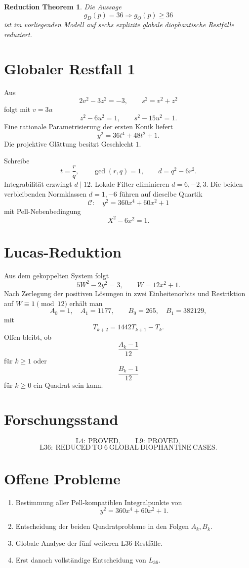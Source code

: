 \documentclass[11pt,a4paper]{article}
\newtheorem{reduction}[theorem]{Reduction Theorem}
\theoremstyle{definition}
\begin{document}
\begin{reduction}
Die Aussage
\[
g_D(p)=36\Longrightarrow g_O(p)\ge36
\]
ist im vorliegenden Modell auf sechs explizite globale diophantische Restfälle reduziert.
\end{reduction}

\section{Globaler Restfall 1}
Aus
\[
2v^2-3z^2=-3,\qquad s^2=v^2+z^2
\]
folgt mit \(v=3u\)
\[
z^2-6u^2=1,\qquad s^2-15u^2=1.
\]
Eine rationale Parametrisierung der ersten Konik liefert
\[
y^2=36t^4+48t^2+1.
\]
Die projektive Glättung besitzt Geschlecht \(1\).

Schreibe
\[
t=\frac rq,\qquad \gcd(r,q)=1,\qquad d=q^2-6r^2.
\]
Integrabilität erzwingt \(d\mid12\). Lokale Filter eliminieren \(d=6,-2,3\). Die beiden verbleibenden Normklassen \(d=1,-6\) führen auf dieselbe Quartik
\[
\boxed{\mathcal C:\quad y^2=360x^4+60x^2+1}
\]
mit Pell-Nebenbedingung
\[
\boxed{X^2-6x^2=1.}
\]

\section{Lucas-Reduktion}
Aus dem gekoppelten System folgt
\[
5W^2-2y^2=3,\qquad W=12x^2+1.
\]
Nach Zerlegung der positiven Lösungen in zwei Einheitenorbits und Restriktion auf \(W\equiv1\pmod{12}\) erhält man
\[
A_0=1,\quad A_1=1177,
\qquad
B_0=265,\quad B_1=382129,
\]
mit
\[
\boxed{T_{k+2}=1442T_{k+1}-T_k.}
\]
Offen bleibt, ob
\[
\frac{A_k-1}{12}
\]
für \(k\ge1\) oder
\[
\frac{B_k-1}{12}
\]
für \(k\ge0\) ein Quadrat sein kann.

\section{Forschungsstand}
\[
\boxed{\mathrm{L4:\ PROVED}},
\qquad
\boxed{\mathrm{L9:\ PROVED}},
\]
\[
\boxed{\mathrm{L36:\ REDUCED\ TO\ 6\ GLOBAL\ DIOPHANTINE\ CASES}.}
\]

\section{Offene Probleme}
\begin{enumerate}
\item Bestimmung aller Pell-kompatiblen Integralpunkte von
\[
y^2=360x^4+60x^2+1.
\]
\item Entscheidung der beiden Quadratprobleme in den Folgen \(A_k,B_k\).
\item Globale Analyse der fünf weiteren L36-Restfälle.
\item Erst danach vollständige Entscheidung von \(L_{36}\).
\end{enumerate}
\end{document}
